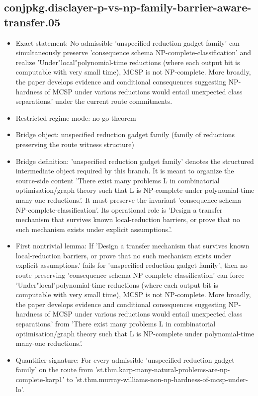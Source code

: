 \documentclass[11pt]{article}
\begin{document}
\subsection*{conjpkg.disclayer-p-vs-np-family-barrier-aware-transfer.05}
\begin{itemize}
\item Exact statement: No admissible 'unspecified reduction gadget family' can simultaneously preserve 'consequence schema NP-complete-classification' and realize 'Under"local"polynomial-time reductions (where each output bit is computable with very small time), MCSP is not NP-complete. More broadly, the paper develops evidence and conditional consequences suggesting NP-hardness of MCSP under various reductions would entail unexpected class separations.' under the current route commitments.
\item Restricted-regime mode: no-go-theorem
\item Bridge object: unspecified reduction gadget family (family of reductions preserving the route witness structure)
\item Bridge definition: 'unspecified reduction gadget family' denotes the structured intermediate object required by this branch. It is meant to organize the source-side content 'There exist many problems L in combinatorial optimisation/graph theory such that L is NP-complete under polynomial-time many-one reductions.'. It must preserve the invariant 'consequence schema NP-complete-classification'. Its operational role is 'Design a transfer mechanism that survives known local-reduction barriers, or prove that no such mechanism exists under explicit assumptions.'.
\item First nontrivial lemma: If 'Design a transfer mechanism that survives known local-reduction barriers, or prove that no such mechanism exists under explicit assumptions.' fails for 'unspecified reduction gadget family', then no route preserving 'consequence schema NP-complete-classification' can force 'Under"local"polynomial-time reductions (where each output bit is computable with very small time), MCSP is not NP-complete. More broadly, the paper develops evidence and conditional consequences suggesting NP-hardness of MCSP under various reductions would entail unexpected class separations.' from 'There exist many problems L in combinatorial optimisation/graph theory such that L is NP-complete under polynomial-time many-one reductions.'.
\item Quantifier signature: For every admissible 'unspecified reduction gadget family' on the route from 'st.thm.karp-many-natural-problems-are-np-complete-karp1' to 'st.thm.murray-williams-non-np-hardness-of-mcsp-under-lo'.

\end{itemize}
\end{document}
